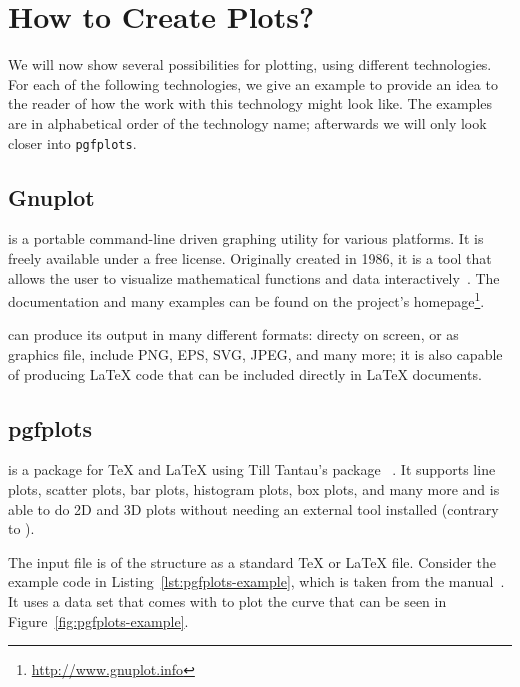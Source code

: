 \section{How to Create Plots?}

We will now show several possibilities for plotting, using different
technologies. For each of the following technologies, we give an example to
provide an idea to the reader of how the work with this technology might look
like. The examples are in alphabetical order of the technology name; afterwards
we will only look closer into \texttt{pgfplots}.

\subsection{Gnuplot}

 is a portable command-line driven graphing utility for
various platforms.  It is freely available under a free license.  Originally
created in 1986, it is a tool that allows the user to visualize mathematical
functions and data interactively~\cite{WilliamsKelley2016}.  The documentation
and many examples can be found on the project's
homepage\footnote{\href{http://www.gnuplot.info}{http://www.gnuplot.info}}.

 can produce its output in many different formats: directy on
screen, or as graphics file, include PNG, EPS, SVG, JPEG, and many more; it is
also capable of producing \LaTeX{} code that can be included directly in
\LaTeX{} documents.

\subsection{pgfplots}

 is a package for \TeX{} and \LaTeX{} using Till Tantau's
package ~\cite{Feuersaenger2016}.  It supports line
plots, scatter plots, bar plots, histogram plots, box plots, and many more and
is able to do 2D and 3D plots without needing an external tool installed
(contrary to ).

The input file is of the structure as a standard \TeX{} or \LaTeX{} file.
Consider the example code in Listing~\ref{lst:pgfplots-example}, which is taken
from the  manual~\cite{Feuersaenger2016}.  It uses a data set
that comes with  to plot the curve that can be seen in
Figure~\ref{fig:pgfplots-example}.

